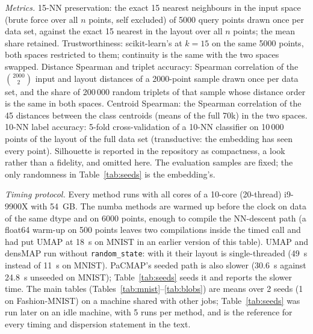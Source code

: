 \documentclass[11pt]{article}
\begin{document}
\emph{Metrics.} 15-NN preservation: the exact 15 nearest neighbours in the input space (brute force
over all $n$ points, self excluded) of 5000 query points drawn once per data set, against the exact 15
nearest in the layout over all $n$ points; the mean share retained. Trustworthiness: scikit-learn's at
$k = 15$ on the same 5000 points, both spaces restricted to them; continuity is the same with the two
spaces swapped. Distance Spearman and triplet accuracy: Spearman correlation of the $\binom{2000}{2}$
input and layout distances of a 2000-point sample drawn once per data set, and the share of 200\,000
random triplets of that sample whose distance order is the same in both spaces. Centroid Spearman: the
Spearman correlation of the 45 distances between the class centroids (means of the full 70k) in the two
spaces. 10-NN label accuracy: 5-fold cross-validation of a 10-NN classifier on 10\,000 points of the
layout of the full data set (transductive: the embedding has seen every point). Silhouette is reported in the repository as compactness, a look rather than a fidelity, and
omitted here. The evaluation samples are fixed; the only randomness in Table~\ref{tab:seeds} is the
embedding's.

\emph{Timing protocol.} Every method runs with all cores of a 10-core (20-thread) i9-9900X with 54~GB.
The numba methods are warmed up before the clock on data of the same dtype and on 6000 points, enough to
compile the NN-descent path (a float64 warm-up on 500 points leaves two compilations inside the timed
call and had put UMAP at 18~s on MNIST in an earlier version of this table). UMAP and densMAP run
without \texttt{random\_state}: with it their layout is single-threaded (49~s instead of 11~s on MNIST).
PaCMAP's seeded path is also slower (30.6~s against 24.8~s unseeded on MNIST); Table~\ref{tab:seeds}
seeds it and reports the slower time. The main tables (Tables~\ref{tab:mnist}--\ref{tab:blobs}) are means
over 2 seeds (1 on Fashion-MNIST) on a machine shared with other jobs; Table~\ref{tab:seeds} was run
later on an idle machine, with 5 runs per method, and is the reference for every timing and dispersion
statement in the text.
\end{document}
